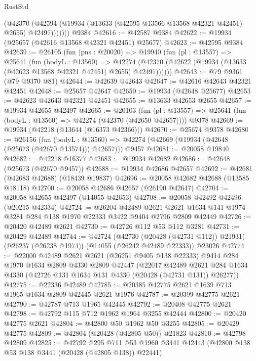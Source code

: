 \begin{lexlean}{RustStd}
\begin{coremodule}
            (@42370
              (@42594 (@19934 (@13633 (@42595 @13566 @13568 @42321 @42451) @2655) @42497)))))))
    @9384
@42616 := @42587 @9384
@42622 := @19934 (@25657 (@42616 @13568 @42321 @42451) @25677)
@42623 := @42595 @9384
@42639 := @26105
    (fun (pns : @20020) =>
    @19940
      (fun (pl : @13557) =>
      @25641
        (fun (bodyL : @13560) =>
        @42274 (@42370 (@42622 (@19934 (@13633 (@42623 @13568 @42321 @42451) @2655) @42497))))))
@42643 := @79 @9361 (@79 @9370 @81)
@42644 := @42639 @42643
@42647 := @42616 @42643 @42321 @42451
@42648 := @25657 @42647
@42650 := @19934 (@42648 @25677)
@42653 := @42623 @42643 @42321 @42451
@42655 := @13633 @42653 @2655
@42657 := @19934 @42655 @42497
@42665 := @20103
    (fun (pl : @13557) => @25641 (fun (bodyL : @13560) => @42274 (@42370 (@42650 @42657))))
    @9378
@42669 := @19934 (@42218 (@13644 (@16373 @42366)))
@42670 := @25674 @9378
@42680 := @26156
    (fun (bodyL : @13560) => @42274 (@42669 (@19934 (@42648 (@25673 (@42670 @13574))) @42657)))
    @9457
@42681 := @20058 @19840
@42682 := @42218 @16377
@42683 := @19934 @42682
@42686 := @42648 (@25673 (@42670 @9457))
@42688 := @19934 @42686 @42657
@42692 := @42681 (@42683 @42688) (@18439 @19837)
@42696 := @20058 @42682 @42688 (@13585 @18118)
@42700 := @20058 @42686 @42657 (@26190 @42647)
@42704 := @20058 @42655 @42497 (@14055 @42653)
@42708 := @20058 @42492 @42496 (@20215 @42334)
@42724 := @26204
    @42489
    @2621
    @2621
    @1634
    @141
    @1974
    @3281
    @284
    @138
    @1970
    @22333
    @3422
    @9404
    @2796
    @2809
    @42449
@42726 := @20420 @42489 @2621
@42730 := @42726 @112 @53 @112 @3281
@42731 := @20429 @42489
@42744 := @42724
    (@42730 (@20428 (@42731 @112)) @21931)
    (@26237 (@26238 @1974))
    (@14055 (@26242 @42489 @22333))
    @23026
@42774 := @22000
    @42489
    @2621
    @2621
    (@26251 @9405 @138 @22333)
    @9414
    @284
    @1970
    @1634
    @2809
    @4330
    @2809
    @42447
    (@22017
      @42489
      @2621
      @284
      @1634
      @4330
      (@42726 @131 @1634 @131 @4330 (@20428 (@42731 @131)) @26277))
@42775 := @22336 @42489
@42785 := @20385 @42775 @2621 @1639 @713 @1965 @1634 @2809 @42445 @2621 @1976
@42787 := @20399 @42775 @2621
@42790 := @42787 @713 @1965 @42445
@42792 := @20408 @42775 @2621
@42798 := @42792 @115 @712 @1962 @1964 @3255 @42444
@42800 := @20420 @42775 @2621
@42804 := @42800 @50 @1962 @50 @3255
@42805 := @20429 @42775
@42809 := @42804 (@20428 (@42805 @50)) @21823
@42810 := @42798 @42809
@42825 := @42792
    @295
    @711
    @53
    @1960
    @3441
    @42443
    (@42800 @138 @53 @138 @3441 (@20428 (@42805 @138)) @22441)

\end{coremodule}
\end{lexlean}
